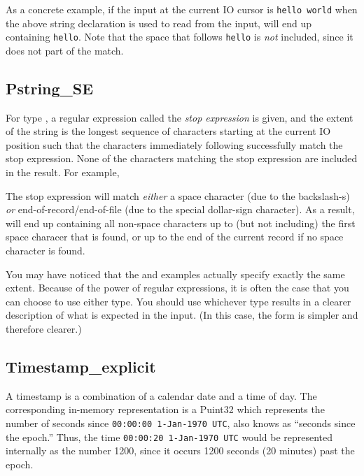 As a concrete example, if the input at the current IO cursor is {\tt hello
world} when the above string declaration is used to read from the
input,  will end up containing {\tt hello}.  Note that the
space that follows {\tt hello} is {\em not} included, since it does not
part of the match.

\subsection{Pstring\_SE}

\aedBegin{}
\aedEnd{}

For type , a regular expression called the {\em stop
expression\/} is given, and the extent of the string is the longest
sequence of characters starting at the current IO position such that
the characters immediately following successfully match the stop
expression.  None of the characters matching the stop expression
are included in the result.
For example,

%
\noindent
The stop expression will match {\em either\/} a space character (due to the backslash-s) {\em or\/}
end-of-record/end-of-file (due to the special dollar-sign character).  As a result,
 will end up containing all non-space characters up to (but not including) the 
first space characer that is found, or up to the end of the current record if no space
character is found.  

You may have noticed that the  and
 examples actually specify exactly the same extent.  
Because of the power of regular expressions, it is often the case that you can
choose to use either type.  You should use whichever type results in a
clearer description of what is expected in the input.  (In this case,
the form is simpler and therefore clearer.)

\subsection{Timestamp\_explicit}

\begin{small}
\aedBegin{}
\aedEnd{}
\end{small}

\noindent
A timestamp is a combination of a calendar date and a time of day.
The corresponding in-memory representation is a Puint32 which
represents the number of seconds since {\tt 00:00:00 1-Jan-1970 UTC},
also knows as ``seconds since the epoch.''
Thus, the time {\tt 00:00:20 1-Jan-1970 UTC} would be represented
internally as the number 1200, since it occurs 1200 seconds
(20 minutes) past the epoch.

